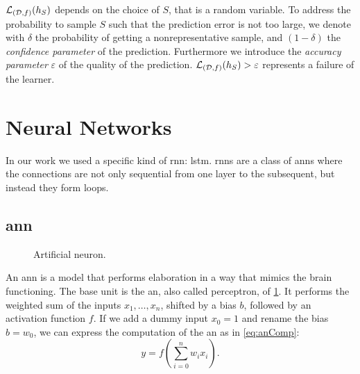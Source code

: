 $\mathcal{L}_{(\mathcal{D},f)}(h_S)$ depends on the choice of $S$, that is a
random variable. To address the probability to sample $S$ such that
the prediction error is not too large, we denote with $\delta$ the
probability of getting a nonrepresentative sample, and $(1-\delta)$
the \emph{confidence parameter} of the prediction. Furthermore we
introduce the \emph{accuracy parameter} $\varepsilon$ of the quality
of the prediction. $\mathcal{L}_{(\mathcal{D},f)}(h_S)>\varepsilon$ represents
a failure of the learner.





\section{Neural Networks}
In our work we used a specific kind of \ac{rnn}: \ac{lstm}.
\acp{rnn} are a class of \acp{ann} where the connections are not only
sequential from one layer to the subsequent, but instead they form
loops. 

\subsection{\acf{ann}}
\begin{figure}
  \centering
  \caption{Artificial neuron.}
  \label{fig:neuron}
\end{figure}
An \ac{ann} is a model that performs elaboration in a way that
mimics the brain functioning. The base unit is the \ac{an}, also called
perceptron, of
\cref{fig:neuron}. It performs the weighted sum of the inputs
$x_1,\dots,x_n$, shifted by a bias $b$, followed by an activation
function $f$. If we add a dummy input $x_0=1$ and rename the bias
$b=w_0$, we can express the computation of the \ac{an} as in
\cref{eq:anComp}:
\begin{equation}\label{eq:anComp}
  y = f(\sum_{i=0}^n w_i x_i).
\end{equation}

